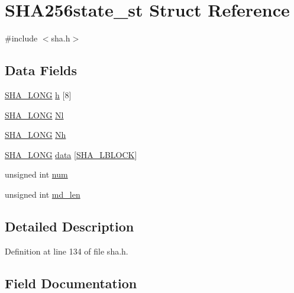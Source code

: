 \hypertarget{struct_s_h_a256state__st}{}\section{S\+H\+A256state\+\_\+st Struct Reference}
\label{struct_s_h_a256state__st}


{\ttfamily \#include $<$sha.\+h$>$}

\subsection*{Data Fields}
\begin{DoxyCompactItemize}
\item 
\hyperlink{include_2openssl_2sha_8h_a1b2e699d6af9a09d35e23c231e415c6c}{S\+H\+A\+\_\+\+L\+O\+NG} \hyperlink{struct_s_h_a256state__st_a997d4bd2419bf873dc84e01ab6fcc7f3}{h} \mbox{[}8\mbox{]}
\item 
\hyperlink{include_2openssl_2sha_8h_a1b2e699d6af9a09d35e23c231e415c6c}{S\+H\+A\+\_\+\+L\+O\+NG} \hyperlink{struct_s_h_a256state__st_a68e0afc627fc16aa87fff8dbba1be42e}{Nl}
\item 
\hyperlink{include_2openssl_2sha_8h_a1b2e699d6af9a09d35e23c231e415c6c}{S\+H\+A\+\_\+\+L\+O\+NG} \hyperlink{struct_s_h_a256state__st_a29a417b9afaabf41fd980b3424c91755}{Nh}
\item 
\hyperlink{include_2openssl_2sha_8h_a1b2e699d6af9a09d35e23c231e415c6c}{S\+H\+A\+\_\+\+L\+O\+NG} \hyperlink{struct_s_h_a256state__st_ac27c0f62ef736cf54667d9ae275e3dc1}{data} \mbox{[}\hyperlink{include_2openssl_2sha_8h_a8902af97bc4411166213b43c6d2057d2}{S\+H\+A\+\_\+\+L\+B\+L\+O\+CK}\mbox{]}
\item 
unsigned int \hyperlink{struct_s_h_a256state__st_a41ddefd3473727cad32a9767c10faed8}{num}
\item 
unsigned int \hyperlink{struct_s_h_a256state__st_a0d87e60065bbf0161a8587c011168d6c}{md\+\_\+len}
\end{DoxyCompactItemize}


\subsection{Detailed Description}


Definition at line 134 of file sha.\+h.



\subsection{Field Documentation}
